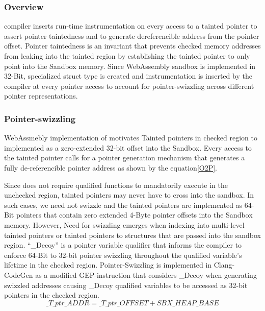 \subsubsection{\textbf{Overview}}
\systemname compiler inserts run-time instrumentation on every access to a tainted pointer to assert pointer taintedness and to generate dereferencible address from the pointer offset. Pointer taintedness is an invariant that prevents checked memory addresses from leaking into the tainted region by establishing the tainted pointer to only point into the Sandbox memory.
Since WebAssembly sandbox is implemented in 32-Bit, specialized struct type is created and instrumentation is inserted by the \systemname compiler at every pointer access to account for pointer-swizzling across different pointer representations.

\subsubsection{\textbf{Pointer-swizzling}}
WebAssmebly implementation of \systemname motivates Tainted pointers in checked region to implemented as a zero-extended 32-bit offset into the Sandbox. Every access to the tainted pointer calls for a pointer generation mechanism that generates a fully de-referencible pointer address as    
shown by the equation\ref{O2P}.

Since \systemname does not require qualified functions to mandatorily execute in the unchecked region, tainted pointers may never have to cross into the sandbox. In such cases, we need not swizzle and the tainted pointers are implemented as 64-Bit pointers that contain zero extended 4-Byte pointer offsets into the Sandbox memory.
However, Need for swizzling emerges when indexing into multi-level tainted pointers or tainted pointers to structures that are passed into the sandbox region. “\_Decoy” is a pointer variable qualifier that informs the compiler to enforce 64-Bit to 32-bit pointer swizzling throughout the qualified variable's lifetime in the checked region. 
Pointer-Swizzling is implemented in Clang-CodeGen as a modified GEP-instruction that considers \_Decoy when generating swizzled addresses causing \_Decoy qualified variables to be accessed as 32-bit pointers in the checked region.
\begin{equation}
  \_T\_ptr\_ADDR = \_T\_ptr\_OFFSET + SBX\_HEAP\_BASE
\label{O2P}
\end{equation}

